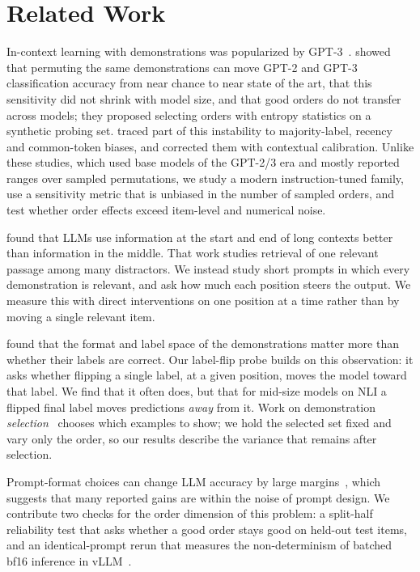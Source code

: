 \section{Related Work}
\label{sec:related}

In-context learning with demonstrations was popularized by GPT-3~\cite{brown2020language}.
\citet{lu2022fantastically} showed that permuting the same demonstrations can move GPT-2 and GPT-3 classification accuracy from near chance to near state of the art, that this sensitivity did not shrink with model size, and that good orders do not transfer across models; they proposed selecting orders with entropy statistics on a synthetic probing set.
\citet{zhao2021calibrate} traced part of this instability to majority-label, recency and common-token biases, and corrected them with contextual calibration.
Unlike these studies, which used base models of the GPT-2/3 era and mostly reported ranges over sampled permutations, we study a modern instruction-tuned family, use a sensitivity metric that is unbiased in the number of sampled orders, and test whether order effects exceed item-level and numerical noise.

\citet{liu2024lost} found that LLMs use information at the start and end of long contexts better than information in the middle.
That work studies retrieval of one relevant passage among many distractors.
We instead study short prompts in which every demonstration is relevant, and ask how much each position steers the output.
We measure this with direct interventions on one position at a time rather than by moving a single relevant item.

\citet{min2022rethinking} found that the format and label space of the demonstrations matter more than whether their labels are correct.
Our label-flip probe builds on this observation: it asks whether flipping a single label, at a given position, moves the model toward that label.
We find that it often does, but that for mid-size models on NLI a flipped final label moves predictions \emph{away} from it.
Work on demonstration \emph{selection}~\cite{liu2022makes,rubin2022learning} chooses which examples to show; we hold the selected set fixed and vary only the order, so our results describe the variance that remains after selection.

Prompt-format choices can change LLM accuracy by large margins~\cite{sclar2024quantifying}, which suggests that many reported gains are within the noise of prompt design.
We contribute two checks for the order dimension of this problem: a split-half reliability test that asks whether a good order stays good on held-out test items, and an identical-prompt rerun that measures the non-determinism of batched bf16 inference in vLLM~\cite{kwon2023efficient}.
